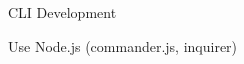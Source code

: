 \begin{cventries}
	\cventry
	{} %
	{CLI Development} %
	{} %
	{} %
	{
		\begin{cvitems} %
			\item {Use Node.js (commander.js, inquirer)}
		\end{cvitems}
	}

\end{cventries}
